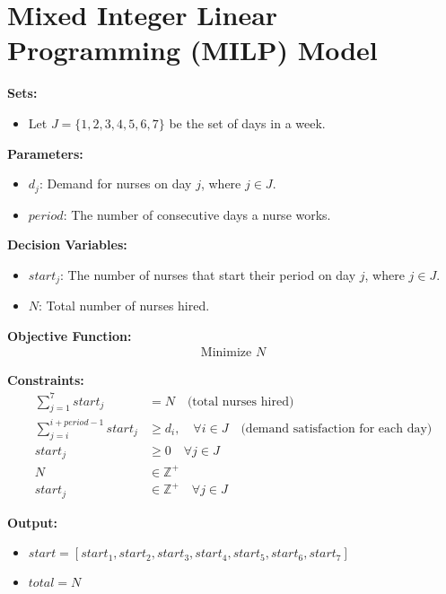 \documentclass{article}
\begin{document}
\section*{Mixed Integer Linear Programming (MILP) Model}

\textbf{Sets:}
\begin{itemize}
    \item Let $J = \{1, 2, 3, 4, 5, 6, 7\}$ be the set of days in a week.
\end{itemize}

\textbf{Parameters:}
\begin{itemize}
    \item $d_j$: Demand for nurses on day $j$, where $j \in J$.
    \item $period$: The number of consecutive days a nurse works.
\end{itemize}

\textbf{Decision Variables:}
\begin{itemize}
    \item $start_j$: The number of nurses that start their period on day $j$, where $j \in J$.
    \item $N$: Total number of nurses hired.
\end{itemize}

\textbf{Objective Function:}
\begin{align*}
    \text{Minimize } N
\end{align*}

\textbf{Constraints:}
\begin{align}
    \sum_{j=1}^{7} start_j & = N \quad \text{(total nurses hired)} \\
    \sum_{j=i}^{i + period - 1} start_j & \geq d_i, \quad \forall i \in J \quad \text{(demand satisfaction for each day)} \\
    start_j & \geq 0 \quad \forall j \in J \\
    N & \in \mathbb{Z}^{+} \\
    start_j & \in \mathbb{Z}^{+} \quad \forall j \in J
\end{align}

\textbf{Output:}
\begin{itemize}
    \item $start = [start_1, start_2, start_3, start_4, start_5, start_6, start_7]$
    \item $total = N$
\end{itemize}
\end{document}
